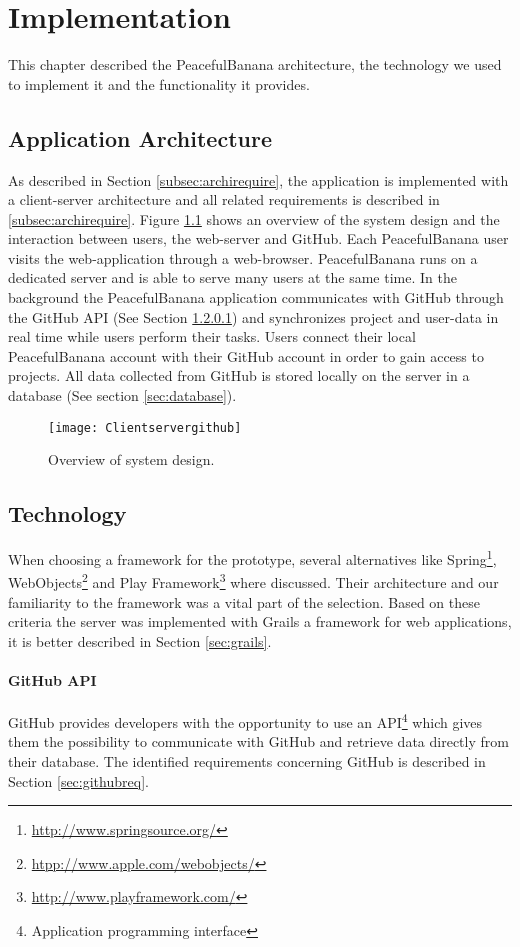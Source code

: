 \chapter{Implementation}
\label{chap:implementation}
This chapter described the PeacefulBanana architecture, the technology we used to implement it and the functionality it provides. 

\section{Application Architecture}
As described in Section \ref{subsec:archirequire}, the application is implemented with a client-server architecture and all related requirements is described in \ref{subsec:archirequire}. Figure \ref{ClientServerGithub} shows an overview of the system design and the interaction between users, the web-server and GitHub. Each PeacefulBanana user visits the web-application through a web-browser. PeacefulBanana runs on a dedicated server and is able to serve many users at the same time. In the background the PeacefulBanana application communicates with GitHub through the GitHub API (See Section \ref{githubapi}) and synchronizes project and user-data in real time while users perform their tasks. Users connect their local PeacefulBanana account with their GitHub account in order to gain access to projects. All data collected from GitHub is stored locally on the server in a database (See section \ref{sec:database}). 
\begin{figure}[H]
    \centering
        \texttt{[image: Clientservergithub]}
    \caption{Overview of system design.}
    \label{ClientServerGithub}
\end{figure}

\section{Technology}
When choosing a framework for the prototype, several alternatives like Spring\footnote{\url{http://www.springsource.org/}}, WebObjects\footnote{\url{htpp://www.apple.com/webobjects/}} and Play Framework\footnote{\url{http://www.playframework.com/}} where discussed. Their architecture and our familiarity to the framework was a vital part of the selection. Based on these criteria the server was implemented with Grails a framework for web applications, it is better described in Section \ref{sec:grails}. 

\subsubsection{GitHub API}
\label{githubapi}
GitHub provides developers with the opportunity to use an API\footnote{Application programming interface} which gives them the possibility to communicate with GitHub and retrieve data directly from their database. The identified requirements concerning GitHub is described in Section \ref{sec:githubreq}.

